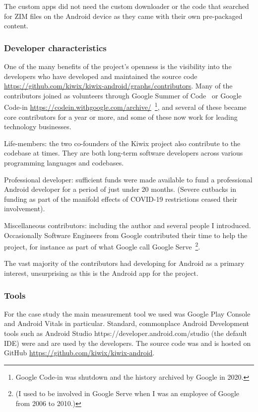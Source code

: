 The custom apps did not need the custom downloader or the code that searched for ZIM files on the Android device as they came with their own pre-packaged content.


\subsubsection{Developer characteristics}
One of the many benefits of the project’s openness is the visibility into the developers who have developed and maintained the source code \url{https://github.com/kiwix/kiwix-android/graphs/contributors}. Many of the contributors joined as volunteers through Google Summer of Code~\citep{google_summer_of_code} or Google Code-in \url{https://codein.withgoogle.com/archive/}~\footnote{Google Code-in was shutdown and the history archived by Google in 2020.}, and several of these became core contributors for a year or more, and some of these now work for leading technology businesses. 

Life-members: the two co-founders of the Kiwix project also contribute to the codebase at times. They are both long-term software developers across various programming languages and codebases.

Professional developer: sufficient funds were made available to fund a professional Android developer for a period of just under 20 months. (Severe cutbacks in funding as part of the manifold effects of COVID-19 restrictions ceased their involvement).

Miscellaneous contributors: including the author and several people I introduced. Occasionally Software Engineers from Google contributed their time to help the project, for instance as part of what Google call Google Serve~\footnote{(I used to be involved in Google Serve when I was an employee of Google from 2006 to 2010.)}.

The vast majority of the contributors had developing for Android as a primary interest, unsurprising as this is the Android app for the project.

\subsubsection{Tools}
For the case study the main measurement tool we used was Google Play Console and Android Vitals in particular. Standard, commonplace Android Development tools such as Android Studio https://developer.android.com/studio (the default IDE) were and are used by the developers. The source code was and is hosted on GitHub \url{https://github.com/kiwix/kiwix-android}.

